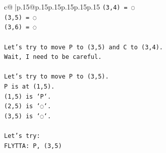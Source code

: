 \documentclass{article}
\begin{document}
{\begin{supertabular}{c@{$\;$}|p{.15\linewidth}@{}p{.15\linewidth}p{.15\linewidth}p{.15\linewidth}p{.15\linewidth}p{.15\linewidth}}
{{{\texttt{(3,4) = ◌} \\
\texttt{(3,5) = ◌} \\
\texttt{(3,6) = ◌} \\
\\ 
\texttt{Let's try to move P to (3,5) and C to (3,4).} \\
\texttt{Wait, I need to be careful.} \\
\\ 
\texttt{Let's try to move P to (3,5).} \\
\texttt{P is at (1,5).} \\
\texttt{(1,5) is `P`.} \\
\texttt{(2,5) is `◌`.} \\
\texttt{(3,5) is `◌`.} \\
\\ 
\texttt{Let's try:} \\
\texttt{FLYTTA: P, (3,5)} \\
            }
        }
    }
     \\ \\


\end{supertabular}}
\end{document}
